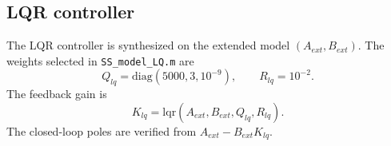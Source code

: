 \subsection{LQR controller}

The LQR controller is synthesized on the extended model $\left(A_{ext}, B_{ext}\right)$. The weights selected in \texttt{SS\_model\_LQ.m} are
\begin{equation}
    Q_{lq} = \mathrm{diag}(5000, 3, 10^{-9}), \qquad R_{lq} = 10^{-2}.
\end{equation}
The feedback gain is
\begin{equation}
    K_{lq} = \mathrm{lqr}(A_{ext}, B_{ext}, Q_{lq}, R_{lq}).
\end{equation}
The closed-loop poles are verified from $A_{ext} - B_{ext} K_{lq}$.
